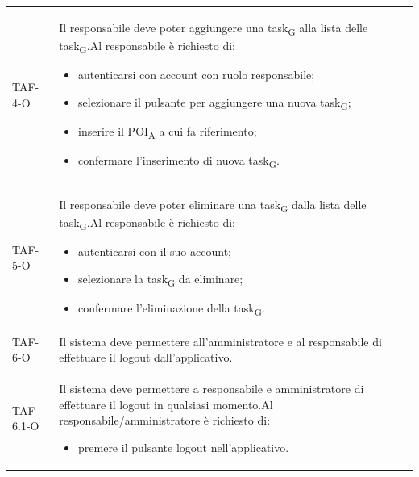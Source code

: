\begin{longtable}{ >{\centering}p{} >{}p{}
		>{\centering}p{}}
	TAF-4-O & Il responsabile deve poter aggiungere una task\textsubscript{G} alla lista delle task\textsubscript{G}.\newline Al responsabile è richiesto di: \begin{itemize}\item autenticarsi con account con ruolo responsabile; \item selezionare il pulsante per aggiungere una nuova task\textsubscript{G}; \item inserire il POI\textsubscript{A} a cui fa riferimento; \item confermare l'inserimento di nuova task\textsubscript{G}. \end{itemize} & 0\tabularnewline

	

	TAF-5-O & Il responsabile deve poter eliminare una task\textsubscript{G} dalla lista delle task\textsubscript{G}.\newline Al responsabile è richiesto di: \begin{itemize} \item autenticarsi con il suo account; \item selezionare la task\textsubscript{G} da eliminare; \item confermare l'eliminazione della task\textsubscript{G}. \end{itemize} & 0\tabularnewline

	TAF-6-O & Il sistema deve permettere all'amministratore e al responsabile di effettuare il logout dall'applicativo. & 0\tabularnewline
	TAF-6.1-O & Il sistema deve permettere a responsabile e amministratore di effettuare il logout in qualsiasi momento.\newline Al responsabile/amministratore è richiesto di: \begin{itemize} \item premere il pulsante logout nell'applicativo. \end{itemize} & 0\tabularnewline


\end{longtable}
